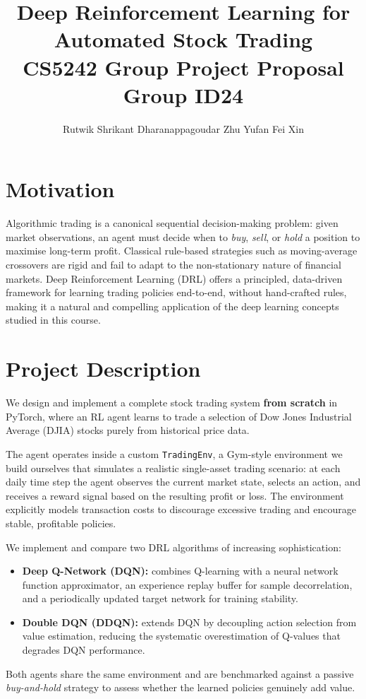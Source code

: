 \documentclass[10pt,twocolumn]{article}
\title{\vspace{-1.5em}\textbf{Deep Reinforcement Learning for Automated Stock Trading}\\[2pt]
\normalsize CS5242 Group Project Proposal \textemdash{} Group ID24}
\author{Rutwik Shrikant Dharanappagoudar \quad Zhu Yufan \quad Fei Xin}
\date{\vspace{-1.2em}}
\begin{document}
\maketitle
\thispagestyle{empty}
\vspace{-1em}

\section{Motivation}
Algorithmic trading is a canonical sequential decision-making problem: given
market observations, an agent must decide when to \emph{buy}, \emph{sell},
or \emph{hold} a position to maximise long-term profit.
Classical rule-based strategies such as moving-average crossovers are rigid
and fail to adapt to the non-stationary nature of financial markets.
Deep Reinforcement Learning (DRL) offers a principled, data-driven framework
for learning trading policies end-to-end, without hand-crafted rules,
making it a natural and compelling application of the deep learning
concepts studied in this course.

\section{Project Description}
We design and implement a complete stock trading system \textbf{from scratch}
in PyTorch, where an RL agent learns to trade a selection of
Dow Jones Industrial Average (DJIA) stocks purely from historical price data.

The agent operates inside a custom \texttt{TradingEnv}, a Gym-style
environment we build ourselves that simulates a realistic single-asset
trading scenario: at each daily time step the agent observes the current
market state, selects an action, and receives a reward signal based on
the resulting profit or loss.
The environment explicitly models transaction costs to discourage excessive
trading and encourage stable, profitable policies.

We implement and compare two DRL algorithms of increasing sophistication:
\begin{itemize}
  \item \textbf{Deep Q-Network (DQN):} combines Q-learning with a neural
        network function approximator, an experience replay buffer for
        sample decorrelation, and a periodically updated target network
        for training stability.
  \item \textbf{Double DQN (DDQN):} extends DQN by decoupling action
        selection from value estimation, reducing the systematic
        overestimation of Q-values that degrades DQN performance.
\end{itemize}
Both agents share the same environment and are benchmarked against a
passive \emph{buy-and-hold} strategy to assess whether the learned
policies genuinely add value.
\end{document}
